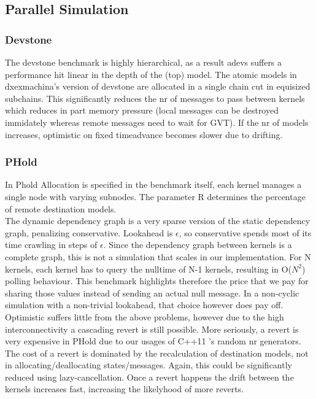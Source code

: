 \subsection{Parallel Simulation}
\subsubsection{Devstone}
The devstone \cite{DEVStone} benchmark is highly hierarchical, as a result adevs suffers a performance hit linear in the depth of the (top) model. The atomic models in dxexmachina's version of devstone are allocated in a single chain cut in equisized subchains. This significantly reduces the nr of messages to pass between kernels which reduces in part memory pressure (local messages can be destroyed immidately whereas remote messages need to wait for GVT). If the nr of models increases, optimistic on fixed timeadvance becomes slower due to drifting.
\subsubsection{PHold}
In Phold \cite{PHOLD} Allocation is specified in the benchmark itself, each kernel manages a single node with varying subnodes. The parameter R determines the percentage of remote destination models.\\
The dynamic dependency graph is a very sparse version of the static dependency graph, penalizing conservative. Lookahead is $\epsilon$, so conservative spends most of its time crawling in steps of $\epsilon$. Since the dependency graph between kernels is a complete graph, this is not a simulation that scales in our implementation. For N kernels, each kernel has to query the nulltime of N-1 kernels, resulting in O($N^2$) polling behaviour. This benchmark highlights therefore the price that we pay for sharing those values instead of sending an actual null message. In a non-cyclic simulation with a non-trivial lookahead, that choice however does pay off.\\
Optimistic suffers little from the above problems, however due to the high interconnectivity a cascading revert is still possible. More seriously, a revert is very expensive in PHold due to our usages of C++11 's random nr generators. The cost of a revert is dominated by the recalculation of destination models, not in allocating/deallocating states/messages. Again, this could be significantly reduced using lazy-cancellation. Once a revert happens the drift between the kernels increases fast, increasing the likelyhood of more reverts. 

